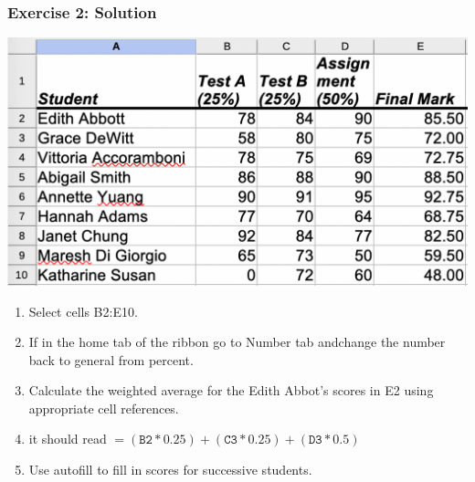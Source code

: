 \documentclass[12pt]{beamer}
\begin{document}
	\begin{frame}
		\frametitle{Exercise 2: Solution}
		\begin{center}
			\includegraphics[width= 0.6 \textwidth]{Exercise2Soln.png}
		\end{center}
		\begin{enumerate}
			\item Select cells B2:E10.
			\item If in the home tab of the ribbon go to Number tab andchange the number back to general from percent. 
			\item Calculate the weighted average for the Edith Abbot's scores in E2 using appropriate cell references. 
			\item it should read $=(\texttt{B2}*0.25)+(\texttt{C3}*0.25)+(\texttt{D3}*0.5)$
			\item Use autofill to fill in scores for successive students.		
		\end{enumerate}
	\end{frame}
\end{document}

